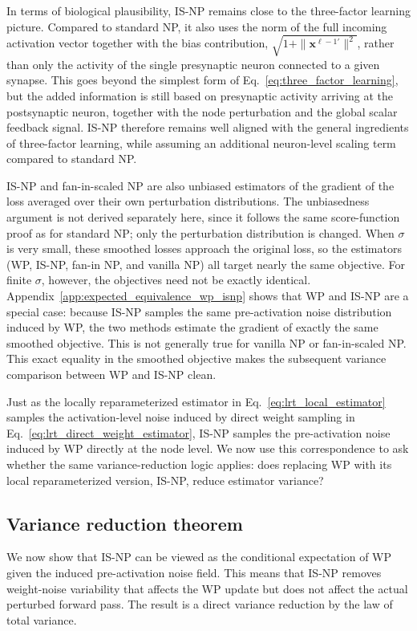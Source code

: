 In terms of biological plausibility, IS-NP remains close to the three-factor learning picture. Compared to standard NP, it also uses the norm of the full incoming activation vector together with the bias contribution, \(\sqrt{1+\|\mathbf{x}^{\ell-1\prime}\|^2}\), rather than only the activity of the single presynaptic neuron connected to a given synapse. This goes beyond the simplest form of Eq.~\eqref{eq:three_factor_learning}, but the added information is still based on presynaptic activity arriving at the postsynaptic neuron, together with the node perturbation and the global scalar feedback signal. IS-NP therefore remains well aligned with the general ingredients of three-factor learning, while assuming an additional neuron-level scaling term compared to standard NP.

IS-NP and fan-in-scaled NP are also unbiased estimators of the gradient of the loss averaged over their own perturbation distributions. The unbiasedness argument is not derived separately here, since it follows the same score-function proof as for standard NP; only the perturbation distribution is changed. When \(\sigma\) is very small, these smoothed losses approach the original loss, so the estimators (WP, IS-NP, fan-in NP, and vanilla NP) all target nearly the same objective. For finite \(\sigma\), however, the objectives need not be exactly identical. Appendix~\ref{app:expected_equivalence_wp_isnp} shows that WP and IS-NP are a special case: because IS-NP samples the same pre-activation noise distribution induced by WP, the two methods estimate the gradient of exactly the same smoothed objective. This is not generally true for vanilla NP or fan-in-scaled NP. This exact equality in the smoothed objective makes the subsequent variance comparison between WP and IS-NP clean.

Just as the locally reparameterized estimator in Eq.~\eqref{eq:lrt_local_estimator} samples the activation-level noise induced by direct weight sampling in Eq.~\eqref{eq:lrt_direct_weight_estimator}, IS-NP samples the pre-activation noise induced by WP directly at the node level. We now use this correspondence to ask whether the same variance-reduction logic applies: does replacing WP with its local reparameterized version, IS-NP, reduce estimator variance?
\subsection{Variance reduction theorem}
\label{sec:variance_reduction_theorem}

We now show that IS-NP can be viewed as the conditional expectation of
WP given the induced pre-activation noise field. This means that IS-NP removes weight-noise
variability that affects the WP update but does not affect the actual perturbed forward pass. The
result is a direct variance reduction by the law of total variance.


